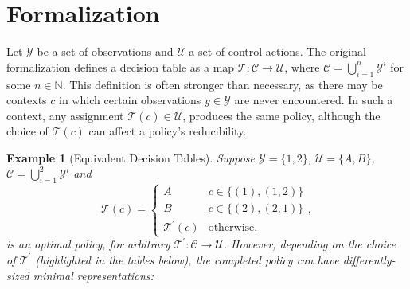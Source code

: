 \documentclass[a4paper,10pt]{article}
\def\1{^{\prime}}
\def\T{\mathcal{T}}
\def\tT{\T\1}
\def\Y{\mathcal{Y}}
\def\C{\mathcal{C}}
\def\U{\mathcal{U}}
\def\NN{\mathbb{N}}
\newtheorem{example}{Example}
\begin{document}
\section{Formalization}
Let $\Y$ be a set of observations and $\U$ a set of control actions.
The original formalization defines a decision table as a map $\T:\C\to\U$, where $\C=\bigcup_{i=1}^n\Y^i$ for some $n\in\NN$.  
This definition is often stronger than necessary, as there may be contexts $c$
in which certain observations $y\in\Y$ are never encountered.  In such a context, any assignment $\T(c)\in\U$,
produces the same policy, although the choice of $\T(c)$ can affect a policy's reducibility.
\begin{example}[Equivalent Decision Tables] \label{ex:complete}
Suppose $\Y=\{1,2\}$, $\U=\{A,B\}$, $\C=\bigcup_{i=1}^2\Y^i$ and 
$$\T(c) = \begin{cases}
A & c \in \{(1), (1,2)\}\\
B & c \in \{(2), (2,1)\}\\
\tT(c) & \text{otherwise.}
\end{cases},$$
is an optimal policy, for arbitrary $\tT:\C\to\U$. However, depending on the choice of $\tT$ (highlighted in the tables below),
the completed policy can have differently-sized minimal representations:


\end{example}
\end{document}
